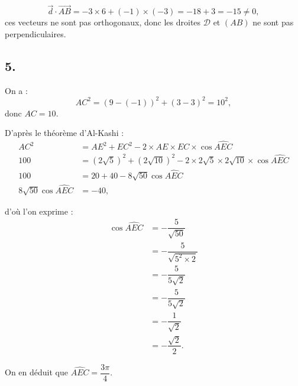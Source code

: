 \documentclass[10pt]{article}
\begin{document}
\[
\vec{d} \cdot \overrightarrow{AB} = -3 \times 6 + (-1) \times (-3) = -18 + 3 = -15 \neq 0,
\]
ces vecteurs ne sont pas orthogonaux, donc les droites \( \mathcal{D} \) et \( (AB) \) ne sont pas perpendiculaires.

\subsection*{5.}

On a :
\[AC^2 = (9 - (-1))^2 + (3 - 3)^2 = 10^2,
\]
donc \( AC = 10 \).

D'après le théorème d'Al-Kashi :
\begin{align*}
AC^2 &= AE^2 + EC^2 - 2 \times AE \times EC \times \cos \widehat{AEC} \\
100 &= \left(2\sqrt{5}\right)^2 + \left(2\sqrt{10}\right)^2 - 2 \times 2\sqrt{5} \times 2\sqrt{10} \times \cos \widehat{AEC} \\
100 &= 20 + 40 - 8\sqrt{50} \cos \widehat{AEC} \\
8\sqrt{50} \cos \widehat{AEC} &= -40,
\end{align*}

d'où l'on exprime :
\begin{align*}
\cos \widehat{AEC} &= -\dfrac{5}{\sqrt{50}} \\
&= -\dfrac{5}{\sqrt{5^2 \times 2}} \\
&= -\dfrac{5}{5\sqrt{2}} \\
&= -\dfrac{5}{5\sqrt{2}} \\
&= -\dfrac{1}{\sqrt{2}} \\
&= -\dfrac{\sqrt{2}}{2}.
\end{align*}

On en déduit que \( \widehat{AEC} = \dfrac{3\pi}{4} \).
\end{document}
